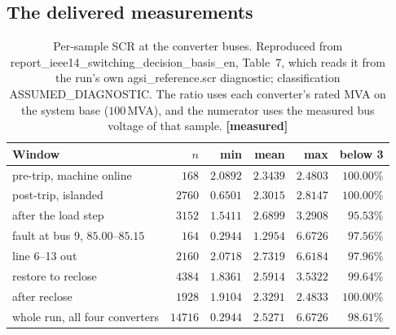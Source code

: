 \documentclass[12pt,a4paper]{article}
\theoremstyle{remark}
\newcommand{\code}[1]{{\ttfamily\small\hyphenchar\font=-1 #1}}
\newcommand{\measured}{\textcolor{ok}{\textbf{[measured]}}}
\begin{document}
\subsection{The delivered measurements}

\begin{table}[H]
\centering
\small
\begin{tabular}{@{}lrrrrr@{}}
\toprule
\textbf{Window} & $n$ & \textbf{min} & \textbf{mean} & \textbf{max} & \textbf{below 3}\\
\midrule
pre-trip, machine online & $168$ & $2.0892$ & $2.3439$ & $2.4803$ & $100.00\%$\\
post-trip, islanded      & $2760$ & $0.6501$ & $\mathbf{2.3015}$ & $2.8147$ & $\mathbf{100.00\%}$\\
after the load step      & $3152$ & $1.5411$ & $2.6899$ & $3.2908$ & $95.53\%$\\
fault at bus 9, $85.00$--$85.15$ & $164$ & $0.2944$ & $1.2954$ & $6.6726$ & $97.56\%$\\
line 6--13 out           & $2160$ & $2.0718$ & $2.7319$ & $6.6184$ & $97.96\%$\\
restore to reclose       & $4384$ & $1.8361$ & $2.5914$ & $3.5322$ & $99.64\%$\\
after reclose            & $1928$ & $1.9104$ & $2.3291$ & $2.4833$ & $100.00\%$\\
\midrule
whole run, all four converters & $14716$ & $0.2944$ & $2.5271$ & $6.6726$ & $\mathbf{98.61\%}$\\
\bottomrule
\end{tabular}
\caption{Per-sample SCR at the converter buses. Reproduced from
\code{report\_ieee14\_switching\_decision\_basis\_en}, Table~7, which reads it
from the run's own \code{agsi\_reference.scr} diagnostic; classification
\code{ASSUMED\_DIAGNOSTIC}. The ratio uses each converter's rated MVA on the
system base ($100$\,MVA), and the numerator uses the measured bus voltage of
that sample. \measured}
\label{tab:scr}
\end{table}
\end{document}
